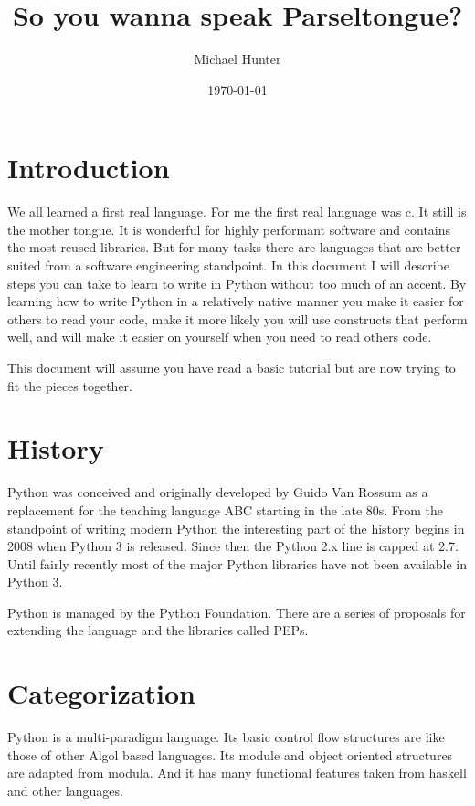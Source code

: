 \documentclass[]{article}
\title{So you wanna speak Parseltongue?}
\author{Michael Hunter}
\date{\today}
\begin{document}
\maketitle

\tableofcontents

\section{Introduction}

We all learned a first real language.  For me the first real
language was c. It still is the mother tongue. It is wonderful for
highly performant software and contains the most reused libraries.
But for many tasks there are languages that are better suited from a
software engineering standpoint. In this document I will describe steps
you can take to learn to write in Python without too much of an accent.
By learning how to write Python in a relatively native manner you make
it easier for others to read your code, make it more likely you will use
constructs that perform well, and will make it easier on yourself when
you need to read others code.

This document will assume you have read a basic tutorial but are now
trying to fit the pieces together.

\section{History}

Python was conceived and originally developed by Guido Van Rossum as a
replacement for the teaching language ABC starting in the late 80s.
From the standpoint of writing modern Python the interesting part of
the history begins in 2008 when Python 3 is released. Since then the
Python 2.x line is capped at 2.7. Until fairly recently most of the
major Python libraries have not been available in Python 3.

Python is managed by the Python Foundation. There are a series of
proposals for extending the language and the libraries called PEPs.

\section{Categorization}

Python is a multi-paradigm language. Its basic control flow structures
are like those of other Algol based languages. Its module and object
oriented structures are adapted from modula. And it has many functional
features taken from haskell and other languages.
\end{document}
